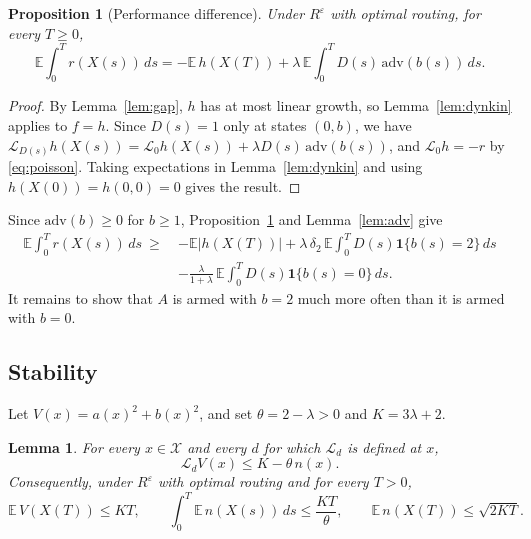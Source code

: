 \documentclass[11pt]{article}
\newtheorem{blem}[bthm]{Lemma}
\newtheorem{bprop}[bthm]{Proposition}
\theoremstyle{definition}
\theoremstyle{remark}
\newcommand{\E}{\mathbb{E}}
\newcommand{\ind}{\mathbf{1}}
\newcommand{\cX}{\mathcal{X}}
\newcommand{\cL}{\mathcal{L}}
\newcommand{\Reps}{R^{\varepsilon}}
\begin{document}
\begin{bprop}[Performance difference]\label{prop:pd}
Under $\Reps$ with optimal routing, for every $T\ge0$,
\[
  \E\int_0^T r(X(s))\,ds
  =-\E\,h(X(T))+\lambda\,\E\int_0^T D(s)\,\mathrm{adv}(b(s))\,ds .
\]
\end{bprop}

\begin{proof}
By Lemma~\ref{lem:gap}, $h$ has at most linear growth, so
Lemma~\ref{lem:dynkin} applies to $f=h$. Since $D(s)=1$ only at states
$(0,b)$, we have $\cL_{D(s)}h(X(s))=\cL_0h(X(s))+\lambda D(s)\,
\mathrm{adv}(b(s))$, and $\cL_0h=-r$ by \eqref{eq:poisson}. Taking expectations
in Lemma~\ref{lem:dynkin} and using $h(X(0))=h(0,0)=0$ gives the result.
\end{proof}

Since $\mathrm{adv}(b)\ge0$ for $b\ge1$, Proposition~\ref{prop:pd} and
Lemma~\ref{lem:adv} give
\begin{equation}\label{eq:pdbound}
\begin{aligned}
  \E\int_0^T r(X(s))\,ds\ \ge\ {}&-\E|h(X(T))|
  +\lambda\,\delta_2\,\E\int_0^T D(s)\ind\{b(s)=2\}\,ds\\
  &-\frac{\lambda}{1+\lambda}\,\E\int_0^T D(s)\ind\{b(s)=0\}\,ds .
\end{aligned}
\end{equation}
It remains to show that $A$ is armed with $b=2$ much more often than it is
armed with $b=0$.

\subsection{Stability}

Let $V(x)=a(x)^2+b(x)^2$, and set $\theta=2-\lambda>0$ and $K=3\lambda+2$.

\begin{blem}\label{lem:drift}
For every $x\in\cX$ and every $d$ for which $\cL_d$ is defined at $x$,
\[
  \cL_dV(x)\le K-\theta\,n(x).
\]
Consequently, under $\Reps$ with optimal routing and for every $T>0$,
\[
  \E\,V(X(T))\le KT,\qquad \int_0^T\E\,n(X(s))\,ds\le\frac{KT}{\theta},
  \qquad \E\,n(X(T))\le\sqrt{2KT}.
\]
\end{blem}
\end{document}
